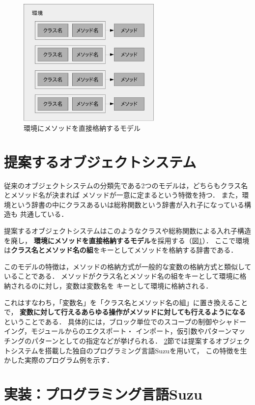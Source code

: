 \documentclass[withpage]{ipsjprosym}  %
\begin{document}
\begin{figure}
\centering
\includegraphics[width=7cm]{fig/environment-crop.pdf}
\caption{環境にメソッドを直接格納するモデル}
\label{fig:environment}
\end{figure}

\section{提案するオブジェクトシステム}

従来のオブジェクトシステムの分類先である2つのモデルは，どちらもクラス名とメソッド名が決まれば
メソッドが一意に定まるという特徴を持つ．
また，環境という辞書の中にクラスあるいは総称関数という辞書が入れ子になっている構造も
共通している．

提案するオブジェクトシステムはこのようなクラスや総称関数による入れ子構造を廃し，
\textbf{環境にメソッドを直接格納するモデル}を採用する（図\ref{fig:environment}）．
ここで環境は\textbf{クラス名とメソッド名の組}をキーとしてメソッドを格納する辞書である．

このモデルの特徴は，メソッドの格納方式が一般的な変数の格納方式と類似していることである．
メソッドがクラス名とメソッド名の組をキーとして環境に格納されるのに対し，変数は変数名を
キーとして環境に格納される．

これはすなわち，「変数名」を「クラス名とメソッド名の組」に置き換えることで，
\textbf{変数に対して行えるあらゆる操作がメソッドに対しても行えるようになる}ということである．
具体的には，ブロック単位でのスコープの制御やシャドーイング，モジュールからのエクスポート・
インポート，仮引数やパターンマッチングのパターンとしての指定などが挙げられる．
\ref{sec:impl}節では提案するオブジェクトシステムを搭載した独自のプログラミング言語Suzuを用いて，
この特徴を生かした実際のプログラム例を示す．

\section{実装：プログラミング言語Suzu}
\label{sec:impl}
\end{document}
